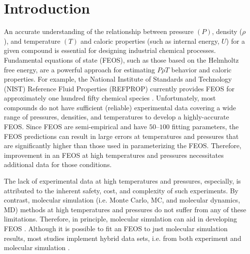 \documentclass[preprint,letterpaper,floatfix,citeautoscript,aip,jcp]{revtex4-1}
\begin{document}
\section{Introduction}

An accurate understanding of the relationship between pressure $(P)$, 
density ($\rho$), and temperature $(T)$ and caloric properties 
(such as internal energy, $U$) for a given compound is essential for designing industrial chemical processes. Fundamental equations of state (FEOS), such as those based on the Helmholtz free energy, are a powerful approach for estimating $P \rho T$ behavior and caloric properties. For example, the National Institute of Standards and Technology (NIST) Reference Fluid Properties (REFPROP) currently provides FEOS for approximately one hundred fifty chemical species \cite{LEMMON-RP91}. Unfortunately, most compounds do not have sufficient (reliable) experimental data covering a wide range of pressures, densities, and temperatures to develop a highly-accurate FEOS. Since FEOS are semi-empirical and have $50$--$100$ fitting parameters, the FEOS predictions can result in large errors at temperatures and pressures that are significantly higher than those used in parameterizing the FEOS. Therefore, improvement in an FEOS at high temperatures and pressures necessitates additional data for those conditions.

The lack of experimental data at high temperatures and pressures, especially, is attributed to the inherent safety, cost, and complexity of such experiments. By contrast, molecular simulation (i.e. Monte Carlo, MC, and molecular dynamics, MD) methods at high temperatures and pressures do not suffer from any of these limitations. Therefore, in principle, molecular simulation can aid in developing FEOS \cite{Thol2016_LJ,Thol_LJTS,Rutkai2017,Lustig2015,Rutkai2015}. Although it is possible to fit an FEOS to just molecular simulation results, most studies implement hybrid data sets, i.e. from both experiment and molecular simulation \cite{Rutkai2013}.
\end{document}
